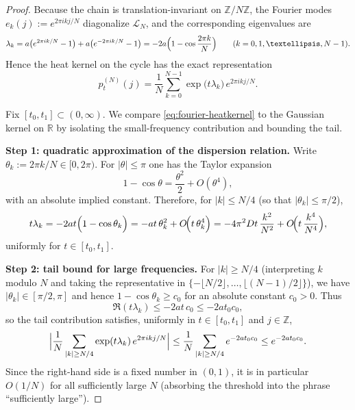 \documentclass[10pt,a4paper]{amsart}
\newcommand{\R}{\mathbb{R}}
\newcommand{\Z}{\mathbb{Z}}
\begin{document}
\begin{proof}
Because the chain is translation-invariant on $\Z/N\Z$, the Fourier modes
$e_k(j):=e^{2\pi i k j/N}$ diagonalize $\mathcal L_N$, and the corresponding eigenvalues are
\[
\lambda_k
=
a\bigl(e^{2\pi i k/N}-1\bigr)+a\bigl(e^{-2\pi i k/N}-1\bigr)
=
-2a\Bigl(1-\cos\frac{2\pi k}{N}\Bigr)
\qquad (k=0,1,\dots,N-1).
\]
Hence the heat kernel on the cycle has the exact representation
\begin{equation}\label{eq:fourier-heatkernel}
p_t^{(N)}(j)
=
\frac{1}{N}\sum_{k=0}^{N-1}\exp\!\bigl(t\lambda_k\bigr)\,e^{2\pi i k j/N}.
\end{equation}

Fix $[t_0,t_1]\subset(0,\infty)$. We compare \eqref{eq:fourier-heatkernel} to the Gaussian
kernel on $\R$ by isolating the small-frequency contribution and bounding the tail.

\smallskip
\noindent\textbf{Step 1: quadratic approximation of the dispersion relation.}
Write $\theta_k:=2\pi k/N\in[0,2\pi)$. For $|\theta|\le \pi$ one has the Taylor expansion
\[
1-\cos\theta=\frac{\theta^2}{2}+O(\theta^4),
\]
with an absolute implied constant. Therefore, for $|k|\le N/4$ (so that $|\theta_k|\le \pi/2$),
\begin{equation}\label{eq:dispersion-approx}
t\lambda_k
=
-2a t\Bigl(1-\cos\theta_k\Bigr)
=
-a t\,\theta_k^2 + O\!\Bigl(t\,\theta_k^4\Bigr)
=
-4\pi^2 D t\,\frac{k^2}{N^2}+O\!\Bigl(t\,\frac{k^4}{N^4}\Bigr),
\end{equation}
uniformly for $t\in[t_0,t_1]$.

\smallskip
\noindent\textbf{Step 2: tail bound for large frequencies.}
For $|k|\ge N/4$ (interpreting $k$ modulo $N$ and taking the representative in
$\{-\lfloor N/2\rfloor,\dots,\lfloor (N-1)/2\rfloor\}$), we have $|\theta_k|\in[\pi/2,\pi]$ and
hence $1-\cos\theta_k\ge c_0$ for an absolute constant $c_0>0$. Thus
\[
\Re(t\lambda_k)\le -2a t\,c_0 \le -2a t_0 c_0,
\]
so the tail contribution satisfies, uniformly in $t\in[t_0,t_1]$ and $j\in\Z$,
\begin{equation}\label{eq:tail}
\Bigl|\frac{1}{N}\sum_{|k|\ge N/4}\exp(t\lambda_k)\,e^{2\pi i k j/N}\Bigr|
\le
\frac{1}{N}\sum_{|k|\ge N/4}e^{-2a t_0 c_0}
\le
e^{-2a t_0 c_0}.
\end{equation}
Since the right-hand side is a fixed number in $(0,1)$, it is in particular $O(1/N)$ for
all sufficiently large $N$ (absorbing the threshold into the phrase ``sufficiently large'').


\end{proof}
\end{document}
